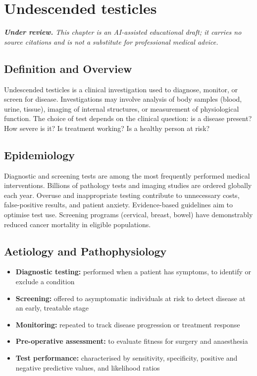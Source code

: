 \chapter{Undescended testicles}

\medskip
\noindent\textit{\textbf{Under review.} This chapter is an AI-assisted educational draft; it carries no source citations and is not a substitute for professional medical advice.}

\section*{Definition and Overview}
Undescended testicles is a clinical investigation used to diagnose, monitor, or screen for disease. Investigations may involve analysis of body samples (blood, urine, tissue), imaging of internal structures, or measurement of physiological function. The choice of test depends on the clinical question: is a disease present? How severe is it? Is treatment working? Is a healthy person at risk?

\section*{Epidemiology}
Diagnostic and screening tests are among the most frequently performed medical interventions. Billions of pathology tests and imaging studies are ordered globally each year. Overuse and inappropriate testing contribute to unnecessary costs, false-positive results, and patient anxiety. Evidence-based guidelines aim to optimise test use. Screening programs (cervical, breast, bowel) have demonstrably reduced cancer mortality in eligible populations.

\section*{Aetiology and Pathophysiology}
\begin{itemize}
    \item \textbf{Diagnostic testing:} performed when a patient has symptoms, to identify or exclude a condition
    \item \textbf{Screening:} offered to asymptomatic individuals at risk to detect disease at an early, treatable stage
    \item \textbf{Monitoring:} repeated to track disease progression or treatment response
    \item \textbf{Pre-operative assessment:} to evaluate fitness for surgery and anaesthesia
    \item \textbf{Test performance:} characterised by sensitivity, specificity, positive and negative predictive values, and likelihood ratios
\end{itemize}

